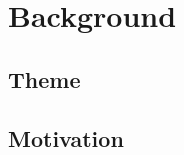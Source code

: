 
\chapter{Background}

\lipsum  %


\section{Theme}

\lipsum  %


\section{Motivation}

\lipsum  %

